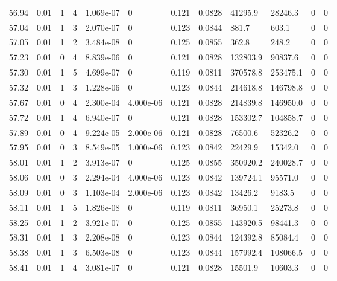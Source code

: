 \documentclass[preview]{standalone}
\begin{document}
{{{{{{{{{{{{{{{{\begin{tabular}{L{1.2cm}C{1.2cm} C{0.3cm}C{0.5cm} C{1.4cm}C{1.4cm} C{1.4cm}C{1.4cm} C{1.6cm}C{1.6cm} C{1.6cm}C{1.6cm}}
  56.94  &  0.01  & 1     &  4 &  1.069e-07  & 0  &  0.121&   0.0828& 41295.9 & 28246.3   &  0 & 0  \\ 
  57.04  &  0.01  & 1     &  3 &  2.070e-07  & 0  &  0.123&   0.0844& 881.7 & 603.1   &  0 & 0  \\ 
  57.05  &  0.01  & 1     &  2 &  3.484e-08  & 0  &  0.125&   0.0855& 362.8 & 248.2   &  0 & 0  \\ 
  57.23  &  0.01  & 0     &  4 &  8.839e-06  & 0  &  0.121&   0.0828& 132803.9 & 90837.6   &  0 & 0  \\ 
  57.30  &  0.01  & 1     &  5 &  4.699e-07  & 0  &  0.119&   0.0811& 370578.8 & 253475.1   &  0 & 0  \\ 
  57.32  &  0.01  & 1     &  3 &  1.228e-06  & 0  &  0.123&   0.0844& 214618.8 & 146798.8   &  0 & 0  \\ 
  57.67  &  0.01  & 0     &  4 &  2.300e-04  & 4.000e-06  &  0.121&   0.0828& 214839.8 & 146950.0   &  0 & 0  \\ 
  57.72  &  0.01  & 1     &  4 &  6.940e-07  & 0  &  0.121&   0.0828& 153302.7 & 104858.7   &  0 & 0  \\ 
  57.89  &  0.01  & 0     &  4 &  9.224e-05  & 2.000e-06  &  0.121&   0.0828& 76500.6 & 52326.2   &  0 & 0  \\ 
  57.95  &  0.01  & 0     &  3 &  8.549e-05  & 1.000e-06  &  0.123&   0.0842& 22429.9 & 15342.0   &  0 & 0  \\ 
  58.01  &  0.01  & 1     &  2 &  3.913e-07  & 0  &  0.125&   0.0855& 350920.2 & 240028.7   &  0 & 0  \\ 
  58.06  &  0.01  & 0     &  3 &  2.294e-04  & 4.000e-06  &  0.123&   0.0842& 139724.1 & 95571.0   &  0 & 0  \\ 
  58.09  &  0.01  & 0     &  3 &  1.103e-04  & 2.000e-06  &  0.123&   0.0842& 13426.2 & 9183.5   &  0 & 0  \\ 
  58.11  &  0.01  & 1     &  5 &  1.826e-08  & 0  &  0.119&   0.0811& 36950.1 & 25273.8   &  0 & 0  \\ 
  58.25  &  0.01  & 1     &  2 &  3.921e-07  & 0  &  0.125&   0.0855& 143920.5 & 98441.3   &  0 & 0  \\ 
  58.31  &  0.01  & 1     &  3 &  2.208e-08  & 0  &  0.123&   0.0844& 124392.8 & 85084.4   &  0 & 0  \\ 
  58.38  &  0.01  & 1     &  3 &  6.503e-08  & 0  &  0.123&   0.0844& 157992.4 & 108066.5   &  0 & 0  \\ 
  58.41  &  0.01  & 1     &  4 &  3.081e-07  & 0  &  0.121&   0.0828& 15501.9 & 10603.3   &  0 & 0  \\ 

\end{tabular}}}}}}}}}}}}}}}}}
\end{document}
